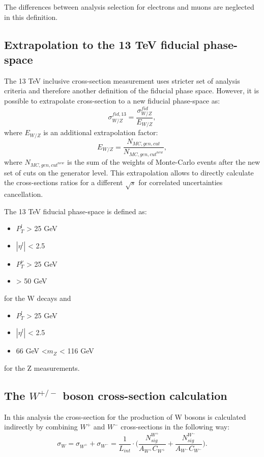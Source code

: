 The differences between analysis selection for electrons and muons are neglected in this definition.

\subsection{Extrapolation to the 13 TeV fiducial phase-space}

The  13 TeV inclusive cross-section measurement  uses stricter set of analysis criteria and therefore another definition of the fiducial phase space. However, it is possible to extrapolate cross-section to a new fiducial phase-space as:
\begin{equation}
\sigma^{fid,13}_{W/Z} = \frac{\sigma^{fid}_{W/Z}}{E_{W/Z}},
\end{equation}
where $E_{W/Z}$ is an additional extrapolation factor:
\begin{equation}
E_{W/Z}=\frac{N_{MC,gen, cut}}{N_{MC,gen, cut^{new}}},
\end{equation}
where $N_{MC,gen, cut^{new}}$ is the sum of the weights of Monte-Carlo events after the new set of cuts on the generator level. This extrapolation allows to directly calculate the cross-sections ratios for a different $\sqrt{s}$ for correlated uncertainties cancellation.

The 13 TeV fiducial phase-space is defined as:
\begin{itemize}
\item $P_T^l$ > 25 GeV
\item $|\eta^l|$ < 2.5 
\item $P_T^{\nu}$ > 25 GeV
\item \mtw > 50 GeV
\end{itemize}
for the W decays and 
\begin{itemize}
\item $P_T^l$ > 25 GeV
\item $|\eta^l|$ < 2.5 
\item 66 GeV <$m_{Z}$ < 116 GeV
\end{itemize}
for the Z measurements.

\subsection{The $W^{+/-}$ boson cross-section calculation}\label{sec:Wcs}
In this analysis the cross-section for the production of W bosons is calculated indirectly by combining $W^{+}$ and $W^{-}$ cross-sections in the following way:
\begin{equation}
\sigma_{W}=\sigma_{W^{+}}+\sigma_{W^{-}} = \frac{1}{L_{int}} \cdot \Big(\frac{N^{W^+}_{sig}}{A_{W^+}C_{W^+}} +  \frac{N^{W^-}_{sig}}{A_{W^-}C_{W^-}} \Big). 
\end{equation}

